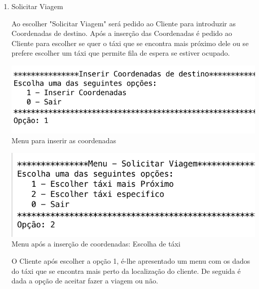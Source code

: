\begin{enumerate}
	\item Solicitar Viagem

Ao escolher "Solicitar Viagem" será pedido ao Cliente para introduzir as Coordenadas de destino. Após a inserção das Coordenadas é pedido ao Cliente para escolher se quer o táxi que se encontra mais próximo dele ou se prefere escolher um táxi que permite fila de espera se estiver ocupado. 

\noindent\begin{minipage}[b]{.5\textwidth}
	\includegraphics[scale=0.55]{imagem/inserirDestino}
	\small{Menu para inserir as coordenadas}
\end{minipage} 
\hfill
\begin{minipage}[b]{.45\textwidth}
	\includegraphics[scale=0.55]{imagem/coorInseridas}
	\small{Menu após a inserção de coordenadas: Escolha de táxi}
\end{minipage}
\hfill

O Cliente após escolher a opção 1, é-lhe apresentado um menu com os dados do táxi que se encontra mais perto da localização do cliente. De seguida é dada a opção de aceitar fazer a viagem ou não. 


\end{enumerate}
